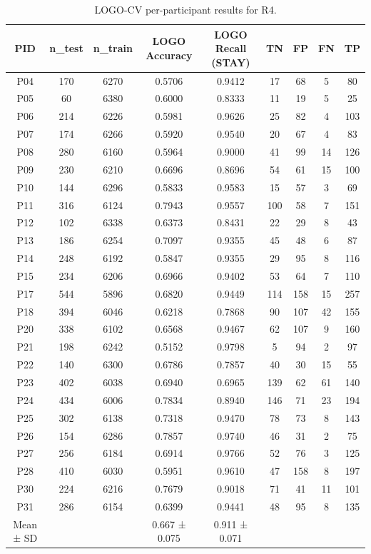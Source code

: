 \begin{table}[hptb]
\small
\centering
\begin{table}
\caption{LOGO-CV per-participant results for R4.}
\label{tab:table4_logo_r4}
\begin{tabular}{ccccccccc}
\toprule
PID & n_test & n_train & LOGO Accuracy & LOGO Recall (STAY) & TN & FP & FN & TP \\
\midrule
P04 & 170 & 6270 & 0.5706 & 0.9412 & 17 & 68 & 5 & 80 \\
P05 & 60 & 6380 & 0.6000 & 0.8333 & 11 & 19 & 5 & 25 \\
P06 & 214 & 6226 & 0.5981 & 0.9626 & 25 & 82 & 4 & 103 \\
P07 & 174 & 6266 & 0.5920 & 0.9540 & 20 & 67 & 4 & 83 \\
P08 & 280 & 6160 & 0.5964 & 0.9000 & 41 & 99 & 14 & 126 \\
P09 & 230 & 6210 & 0.6696 & 0.8696 & 54 & 61 & 15 & 100 \\
P10 & 144 & 6296 & 0.5833 & 0.9583 & 15 & 57 & 3 & 69 \\
P11 & 316 & 6124 & 0.7943 & 0.9557 & 100 & 58 & 7 & 151 \\
P12 & 102 & 6338 & 0.6373 & 0.8431 & 22 & 29 & 8 & 43 \\
P13 & 186 & 6254 & 0.7097 & 0.9355 & 45 & 48 & 6 & 87 \\
P14 & 248 & 6192 & 0.5847 & 0.9355 & 29 & 95 & 8 & 116 \\
P15 & 234 & 6206 & 0.6966 & 0.9402 & 53 & 64 & 7 & 110 \\
P17 & 544 & 5896 & 0.6820 & 0.9449 & 114 & 158 & 15 & 257 \\
P18 & 394 & 6046 & 0.6218 & 0.7868 & 90 & 107 & 42 & 155 \\
P20 & 338 & 6102 & 0.6568 & 0.9467 & 62 & 107 & 9 & 160 \\
P21 & 198 & 6242 & 0.5152 & 0.9798 & 5 & 94 & 2 & 97 \\
P22 & 140 & 6300 & 0.6786 & 0.7857 & 40 & 30 & 15 & 55 \\
P23 & 402 & 6038 & 0.6940 & 0.6965 & 139 & 62 & 61 & 140 \\
P24 & 434 & 6006 & 0.7834 & 0.8940 & 146 & 71 & 23 & 194 \\
P25 & 302 & 6138 & 0.7318 & 0.9470 & 78 & 73 & 8 & 143 \\
P26 & 154 & 6286 & 0.7857 & 0.9740 & 46 & 31 & 2 & 75 \\
P27 & 256 & 6184 & 0.6914 & 0.9766 & 52 & 76 & 3 & 125 \\
P28 & 410 & 6030 & 0.5951 & 0.9610 & 47 & 158 & 8 & 197 \\
P30 & 224 & 6216 & 0.7679 & 0.9018 & 71 & 41 & 11 & 101 \\
P31 & 286 & 6154 & 0.6399 & 0.9441 & 48 & 95 & 8 & 135 \\
Mean ± SD &  &  & 0.667 ± 0.075 & 0.911 ± 0.071 &  &  &  &  \\
\bottomrule
\end{tabular}
\end{table}
\end{table}
